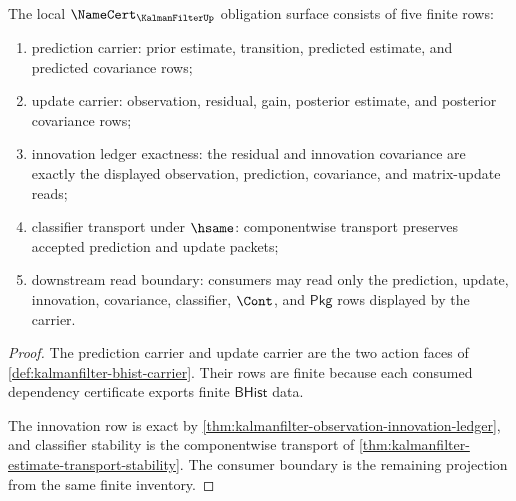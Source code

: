 \begin{theorem}
\label{thm:kalmanfilter-namecert-obligation-surface}
The local $\NameCert_{\KalmanFilterUp}$ obligation surface consists of five finite rows:
\begin{enumerate}
\item prediction carrier: prior estimate, transition, predicted estimate, and predicted covariance rows;
\item update carrier: observation, residual, gain, posterior estimate, and posterior covariance rows;
\item innovation ledger exactness: the residual and innovation covariance are exactly the displayed observation, prediction, covariance, and matrix-update reads;
\item classifier transport under $\hsame$: componentwise transport preserves accepted prediction and update packets;
\item downstream read boundary: consumers may read only the prediction, update, innovation, covariance, classifier, $\Cont$, and $\mathsf{Pkg}$ rows displayed by the carrier.
\end{enumerate}
\end{theorem}
\begin{proof}
The prediction carrier and update carrier are the two action faces of \autoref{def:kalmanfilter-bhist-carrier}. Their rows are finite because each consumed dependency certificate exports finite $\mathsf{BHist}$ data.

The innovation row is exact by \autoref{thm:kalmanfilter-observation-innovation-ledger}, and classifier stability is the componentwise transport of \autoref{thm:kalmanfilter-estimate-transport-stability}. The consumer boundary is the remaining projection from the same finite inventory.
\end{proof}

